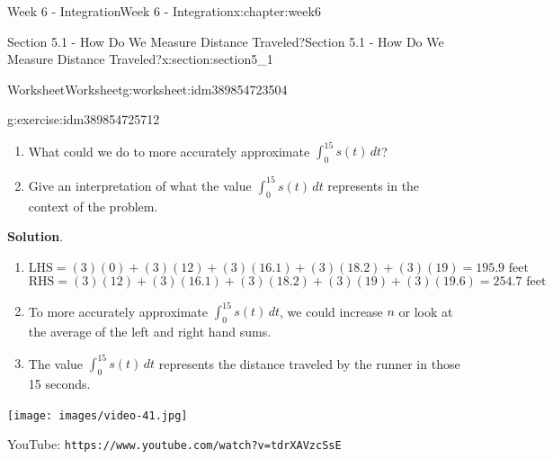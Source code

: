 \documentclass[oneside,10pt,]{book}
\newcommand{\blocktitlefont}{\relax}
\newcommand{\mono}[1]{\texttt{#1}}
\numberwithin{equation}{section}
\newlength{\qrsize}
\newlength{\previewwidth}
\begin{document}
\begin{chapterptx}{Week 6 - Integration}{}{Week 6 - Integration}{}{}{x:chapter:week6}
\begin{sectionptx}{Section 5.1 - How Do We Measure Distance Traveled?}{}{Section 5.1 - How Do We Measure Distance Traveled?}{}{}{x:section:section5_1}
\begin{worksheet-subsection}{Worksheet}{}{Worksheet}{}{}{g:worksheet:idm389854723504}
\begin{divisionexercise}{1}{}{}{g:exercise:idm389854725712}
\begin{enumerate}[label=(\alph*)]
\item{}What could we do to more accurately approximate \(\displaystyle{\int_0^{15} s(t) \, dt}\)?%
\item{}Give an interpretation of what the value \(\displaystyle{\int_0^{15} s(t) \, dt}\) represents in the context of the problem.%
\end{enumerate}
\textbf{\blocktitlefont Solution}.\hypertarget{g:solution:idm389854726848}{}\quad{}%
\begin{enumerate}[label=(\alph*)]
\item{}%
\begin{equation*}
\text{LHS} = (3)(0)+(3)(12)+(3)(16.1)+(3)(18.2)+(3)(19) = 195.9\text{ feet}
\end{equation*}
%
\begin{equation*}
\text{RHS} = (3)(12)+(3)(16.1)+(3)(18.2)+(3)(19)+(3)(19.6) = 254.7\text{ feet}
\end{equation*}
%
\item{}To more accurately approximate \(\displaystyle{\int_0^{15} s(t) \, dt}\), we could increase \(n\) or look at the average of the left and right hand sums.%
\item{}The value \(\displaystyle{\int_0^{15} s(t) \, dt}\) represents the distance traveled by the runner in those 15 seconds.%
\end{enumerate}
\end{divisionexercise}%
\end{worksheet-subsection}
\restoregeometry
\setlength{\qrsize}{9em}
\setlength{\previewwidth}{\linewidth}
\addtolength{\previewwidth}{-\qrsize}
\begin{tcbraster}[raster columns=2, raster column skip=1pt, raster halign=center, raster force size=false, raster left skip=0pt, raster right skip=0pt]%
\begin{tcolorbox}[previewstyle, width=\previewwidth]%
\texttt{[image: images/video-41.jpg]}%
\end{tcolorbox}%
\begin{tcolorbox}[qrstyle]%
{\hypersetup{urlcolor=black}}%
\end{tcolorbox}%
\begin{tcolorbox}[captionstyle]%
\small YouTube: \mono{https://www.youtube.com/watch?v=tdrXAVzcSsE}\end{tcolorbox}%
\end{tcbraster}%
\end{sectionptx}
%
%
\typeout{************************************************}

\end{chapterptx}
\end{document}
